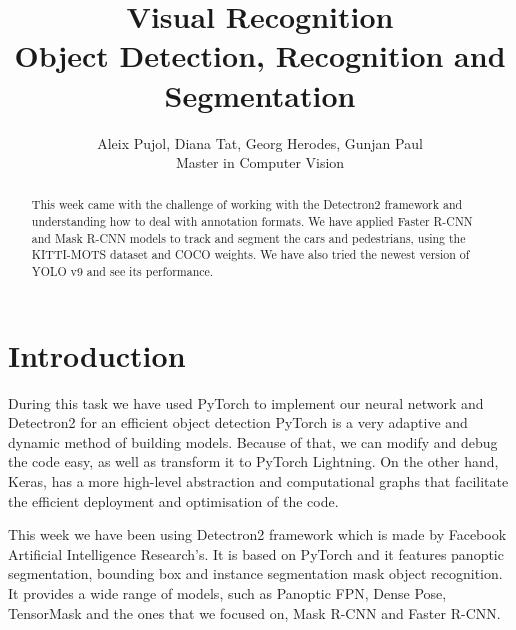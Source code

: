 \documentclass{IEEEtran}
\begin{document}
	
	\newcommand{\redd}[1]{{\color{red}#1}}
	
	\title{\LARGE \bf
		Visual Recognition \\
		{\small Object Detection, Recognition and Segmentation}
	}
	
	\author{ \parbox{4 in}{\centering Aleix Pujol, Diana Tat, Georg Herodes, Gunjan Paul\\
			Master in Computer Vision\\}
	}
	
	
	\maketitle
	
	\thispagestyle{empty}
	\pagestyle{empty}
	
	
	\begin{abstract}
		This week came with the challenge of working with the Detectron2 framework and understanding how to deal with annotation formats. We have applied Faster R-CNN and Mask R-CNN models to track and segment the cars and pedestrians, using the KITTI-MOTS dataset and COCO weights. We have also tried the newest version of YOLO v9 and see its performance. 
	\end{abstract}
	
	
	\section{Introduction}
	During this task we have used PyTorch to implement our neural network and Detectron2 for an efficient object detection
	PyTorch is a very adaptive and dynamic method of building models. Because of that, we can modify and debug the code easy, as well as transform it to PyTorch Lightning. On the other hand, Keras, has a more high-level abstraction  and computational graphs that facilitate the efficient deployment and optimisation of the code.
	
	This week we have been using Detectron2 framework which is made by Facebook Artificial Intelligence Research's. It is based on PyTorch and it features panoptic segmentation, bounding box and instance segmentation mask object recognition. It provides a wide range of models, such as Panoptic FPN, Dense Pose, TensorMask and the ones that we focused on, Mask R-CNN and Faster R-CNN. 
	
\end{document}
